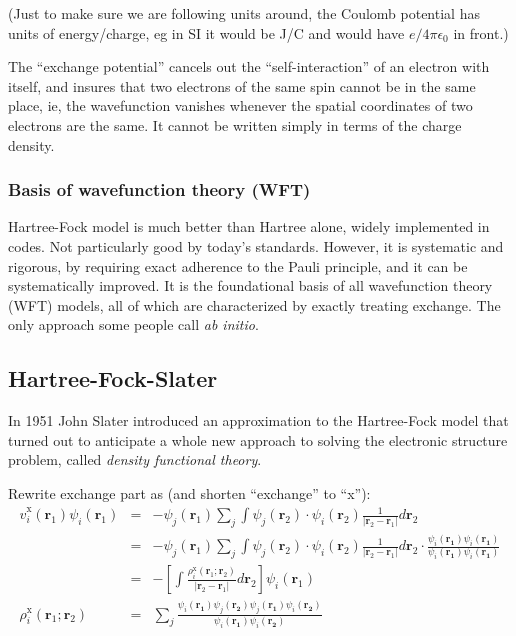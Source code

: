 \documentclass[11pt]{article}
\begin{document}
(Just to make sure we are following units around, the Coulomb potential has units of energy/charge, eg in SI it would be J/C and would have \(e/4\pi\epsilon_0\) in front.)

The ``exchange potential'' cancels out the ``self-interaction'' of an electron with itself, and insures that two electrons of the same spin cannot be in the same place, ie, the wavefunction vanishes whenever the spatial coordinates of two electrons are the same.  It cannot be written simply in terms of the charge density.

\subsubsection{Basis of wavefunction theory (WFT)}
\label{sec:orgf0cf544}
Hartree-Fock model is much better than Hartree alone, widely implemented in codes.   Not particularly good by today's standards.  However, it is
systematic and rigorous, by requiring exact adherence to the Pauli principle, and it can be systematically improved.  It
is the foundational basis of all wavefunction theory (WFT) models, all of which are characterized by exactly treating
exchange. The only approach some people call \emph{ab initio}.

\subsection{Hartree-Fock-Slater}
\label{sec:orgb80e2e0}
In 1951 John Slater introduced an approximation to the Hartree-Fock model that turned out to anticipate a whole new approach to solving the electronic structure problem, called \emph{density functional theory}.  

Rewrite exchange part as (and shorten ``exchange'' to ``x''):
  \begin{eqnarray}
     \hat{v}^{\text{x}}_i(\mathbf{r}_1) \psi_i(\mathbf{r}_1) & = &-\psi_j(\mathbf{r}_1) \sum_{j} \int \psi_j (\mathbf{r}_2) \cdot \psi_i (\mathbf{r}_2)  \frac{1}{|\mathbf{r}_2-\mathbf{r}_1|}d\mathbf{r}_2 \\
 & = & -\psi_j(\mathbf{r}_1) \sum_{j} \int \psi_j (\mathbf{r}_2) \cdot \psi_i (\mathbf{r}_2)  \frac{1}{|\mathbf{r}_2-\mathbf{r}_1|}d\mathbf{r}_2 \cdot \frac{\psi_i(\mathbf{r_1})\psi_i(\mathbf{r_1})}{\psi_i(\mathbf{r_1})\psi_i(\mathbf{r_1})} \\
 & = & -\left [ \int \frac{\rho_i^{\text{x}}(\mathbf{r}_1;\mathbf{r}_2)}{|\mathbf{r}_2-\mathbf{r}_1|}d\mathbf{r}_2 \right ] \psi_i(\mathbf{r}_1) \\
\rho_i^{\text{x}}(\mathbf{r}_1;\mathbf{r}_2)& =& \sum_j \frac{\psi_i(\mathbf{r_1})\psi_j(\mathbf{r_2})\psi_j(\mathbf{r_1})\psi_i(\mathbf{r_2})}{\psi_i(\mathbf{r_1})\psi_i(\mathbf{r_2})}
         \end{eqnarray}
\end{document}
